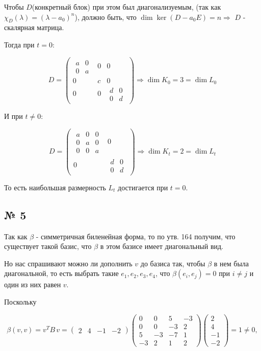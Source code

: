 \documentclass[11pt]{article}
\begin{document}
Чтобы $D$(конкретный блок) при этом был диагонализуемым, (так как $\chi_D(\lambda) = (\lambda - a_0)^n$), должно быть, что $\dim \ker(D - a_0E) = n \Rightarrow$ $D$ - скалярная матрица.

Тогда при $t = 0$:

$$
D =
\begin{pmatrix}
\begin{smallmatrix}a&0\\0&a\end{smallmatrix} 
&0&0\\
0&c&0\\
0&0&
\begin{smallmatrix}d&0\\0&d\end{smallmatrix}
\end{pmatrix} \Rightarrow \dim K_0 = 3 = \dim L_0
$$

И при $t \neq 0$:

$$
D =
\begin{pmatrix}
\begin{matrix}a&0&0\\0&a&0\\0&0&a\end{matrix}
& 0\\
0&
\begin{smallmatrix}d&0\\0&d\end{smallmatrix}
\end{pmatrix} \Rightarrow \dim K_t = 2 = \dim L_t
$$

То есть наибольшая размерность $L_t$ достигается при $t = 0$.

\subsection*{№ 5}
Так как $\beta$ - симметричная биленейная форма, то по утв. 164 получим, что существует такой базис, что $\beta$ в этом базисе имеет диагональный вид.

Но нас спрашивают можно ли дополнить $v$ до базиса так, чтобы $\beta$ в нем была диагональной, то есть выбрать такие $e_1, e_2, e_3, e_4$, что $\beta(e_i, e_j) = 0$ при $i \neq j$ и один из них равен $v$.

Поскольку

$$
\beta(v,v)=v^T B\,v
=\begin{pmatrix}2&4&-1&-2\end{pmatrix}
\begin{pmatrix}
0 & 0 & 5 & -3\\
0 & 0 & -3 & 2\\
5 & -3 & -7 & 1\\
-3 & 2 & 1 & 2
\end{pmatrix}
\begin{pmatrix}2\\4\\-1\\-2\end{pmatrix}
=1\neq0,
$$
\end{document}
